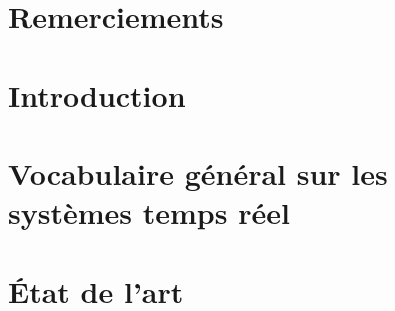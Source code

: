 \documentclass[11pt,a4paper,oneside]{report}
\begin{document}
	\newenvironment{vcenterpage}
	{\newpage\thispagestyle{empty} 
		\vspace*{\fill}}
	{\vspace*{\fill}\par\pagebreak}
	
	\setcounter{page}{0}
	\tableofcontents
%	

	

	
\chapter*{Remerciements}
\thispagestyle{empty}

\newpage

\fancyhead{}

\chapter*{Introduction}{}
	\setcounter{page}{1}

	

\chapter{Vocabulaire général sur les systèmes temps réel}
	\fancyhead[L]{\leftmark}
	
	
\chapter{État de l'art}
	
\end{document}
